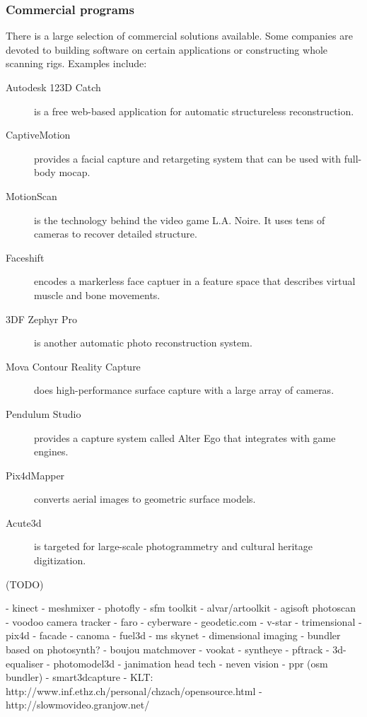 

\subsubsection{Commercial programs} %

There is a large selection of commercial solutions available. Some companies are devoted to building software on certain applications or constructing whole scanning rigs. Examples include:
\begin{description}
\item[Autodesk 123D Catch] is a free web-based application for automatic structureless reconstruction.
\item[CaptiveMotion] provides a facial capture and retargeting system that can be used with full-body mocap.
\item[MotionScan] is the technology behind the video game L.A. Noire. \cite{rockstar2011noire} It uses tens of cameras to recover detailed structure.
\item[Faceshift] encodes a markerless face captuer in a feature space that describes virtual muscle and bone movements.
\item[3DF Zephyr Pro] is another automatic photo reconstruction system.
\item[Mova Contour Reality Capture] does high-performance surface capture with a large array of cameras.
\item[Pendulum Studio] provides a capture system called Alter Ego that integrates with game engines.
\item[Pix4dMapper] converts aerial images to geometric surface models.
\item[Acute3d] is targeted for large-scale photogrammetry and cultural heritage digitization.
\end{description}



(TODO)

- kinect
- meshmixer
- photofly
- sfm toolkit
- alvar/artoolkit
- agisoft photoscan
- voodoo camera tracker
- faro
- cyberware
- geodetic.com
- v-star
- trimensional
- pix4d
- facade
- canoma
- fuel3d
- ms skynet
- dimensional imaging
- bundler based on photosynth?
- boujou matchmover
- vookat
- syntheye
- pftrack
- 3d-equaliser
- photomodel3d
- janimation head tech
- neven vision
- ppr (osm bundler)
- smart3dcapture
- KLT: http://www.inf.ethz.ch/personal/chzach/opensource.html
- http://slowmovideo.granjow.net/

